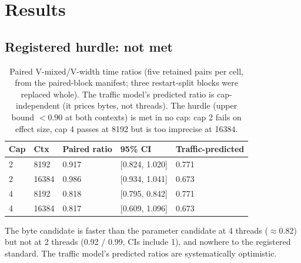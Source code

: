 \documentclass[11pt]{article}
\begin{document}
\section{Results}
\subsection{Registered hurdle: not met}
\label{sec:hurdle}
\begin{table}[ht]
\centering\small
\begin{tabular}{@{}lllll@{}}
\toprule
Cap & Ctx & Paired ratio & 95\% CI & Traffic-predicted \\
\midrule
2 & 8192 & 0.917 & [0.824, 1.020] & 0.771 \\
2 & 16384 & 0.986 & [0.934, 1.041] & 0.673 \\
4 & 8192 & 0.818 & [0.795, 0.842] & 0.771 \\
4 & 16384 & 0.817 & [0.609, 1.096] & 0.673 \\
\bottomrule
\end{tabular}
\caption{Paired V-mixed/V-width time ratios (five retained
pairs per cell, from the paired-block manifest; three
restart-split blocks were replaced whole). The
traffic model's predicted ratio is cap-independent (it prices
bytes, not threads). The
hurdle (upper bound $<0.90$ at both contexts) is met in no cap:
cap 2 fails on effect size, cap 4 passes at 8192 but is too
imprecise at 16384.}
\end{table}
The byte candidate is faster than the parameter candidate at
4 threads ($\approx$0.82) but not at 2 threads (0.92 / 0.99, CIs
include 1), and nowhere to the registered standard. The traffic
model's predicted ratios are systematically optimistic.
\end{document}

